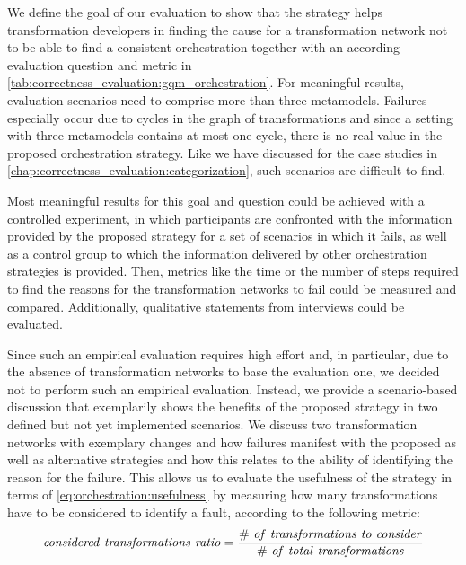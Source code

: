 We define the goal of our evaluation to show that the strategy helps transformation developers in finding the cause for a transformation network not to be able to find a consistent orchestration together with an according evaluation question and metric in \autoref{tab:correctness_evaluation:gqm_orchestration}.
For meaningful results, evaluation scenarios need to comprise more than three metamodels.
Failures especially occur due to cycles in the graph of transformations and since a setting with three metamodels contains at most one cycle, there is no real value in the proposed orchestration strategy.
Like we have discussed for the case studies in \autoref{chap:correctness_evaluation:categorization}, such scenarios are difficult to find.

Most meaningful results for this goal and question could be achieved with a controlled experiment, in which participants are confronted with the information provided by the proposed strategy for a set of scenarios in which it fails, as well as a control group to which the information delivered by other orchestration strategies is provided.
Then, metrics like the time or the number of steps required to find the reasons for the transformation networks to fail could be measured and compared.
Additionally, qualitative statements from interviews could be evaluated.

Since such an empirical evaluation requires high effort and, in particular, due to the absence of transformation networks to base the evaluation one, we decided not to perform such an empirical evaluation.
Instead, we provide a scenario-based discussion that exemplarily shows the benefits of the proposed strategy in two defined but not yet implemented scenarios.
We discuss two transformation networks with exemplary changes and how failures manifest with the proposed as well as alternative strategies and how this relates to the ability of identifying the reason for the failure.
This allows us to evaluate the usefulness of the strategy in terms of \autoref{eq:orchestration:usefulness} by measuring how many transformations have to be considered to identify a fault, according to the following metric:
\begin{align*}
    \mathvariable{considered\ transformations\ ratio = \frac{\#\ of\ transformations\ to\ consider%
    }{\#\ of\ total\ transformations}}
\end{align*}



